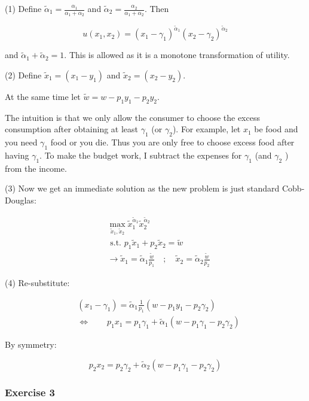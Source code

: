 {{(1) Define $\tilde{\alpha}_{1}=\frac{\alpha_{1}}{\alpha_{1}+\alpha_{2}}$ and $\tilde{\alpha}_{2}=\frac{\alpha_{2}}{\alpha_{1}+\alpha_{2}}$. Then

$$
u\left(x_{1}, x_{2}\right)=\left(x_{1}-\gamma_{1}\right)^{\tilde{\alpha}_{1}}\left(x_{2}-\gamma_{2}\right)^{\tilde{\alpha}_{2}}
$$

and $\tilde{\alpha}_{1}+\tilde{\alpha}_{2}=1$. This is allowed as it is a monotone transformation of utility.

(2) Define $\tilde{x}_{1}=\left(x_{1}-y_{1}\right)$ and $\tilde{x}_{2}=\left(x_{2}-y_{2}\right)$.

At the same time let $\tilde{w}=w-p_{1} y_{1}-p_{2} y_{2}$.

The intuition is that we only allow the consumer to choose the excess consumption after
obtaining at least $\gamma_{1}$ (or $\gamma_{2}$). For example, let $x_{1}$ be food and you need $\gamma_{1}$ food or you die. Thus you are only free to choose excess food after having $\gamma_{1}$. To make the budget work, I subtract the expenses for $\gamma_{1}$ (and $\gamma_{2}$ ) from the income.

(3) Now we get an immediate solution as the new problem is just standard Cobb-Douglas:

$$
\begin{aligned}
& \max _{\tilde{x}_{1}, \tilde{x}_{2}} \tilde{x}_{1}^{\tilde{\alpha}_{1}} \tilde{x}_{2}^{\tilde{\alpha}_{2}} \\
& \text { s.t. } p_{1} \tilde{x}_{1}+p_{2} \tilde{x}_{2}=\tilde{w} \\
& \rightarrow \tilde{x}_{1}=\tilde{\alpha}_{1} \frac{\tilde{w}}{p_{1}} \quad ; \quad \tilde{x}_{2}=\tilde{\alpha}_{2} \frac{\tilde{w}}{p_{2}}
\end{aligned}
$$

(4) Re-substitute:

$$
\begin{aligned}
& \left(x_{1}-\gamma_{1}\right)=\tilde{\alpha}_{1} \frac{1}{p_{1}}\left(w-p_{1} y_{1}-p_{2} \gamma_{2}\right) \\
& \Leftrightarrow \quad \quad p_{1} x_{1}=p_{1} \gamma_{1}+\tilde{\alpha}_{1}\left(w-p_{1} \gamma_{1}-p_{2} \gamma_{2}\right)
\end{aligned}
$$

By symmetry:

$$
p_{2} x_{2}=p_{2} \gamma_{2}+\tilde{\alpha}_{2}\left(w-p_{1} \gamma_{1}-p_{2} \gamma_{2}\right)
$$
}
{
\subsubsection*{Exercise 3}

}}
